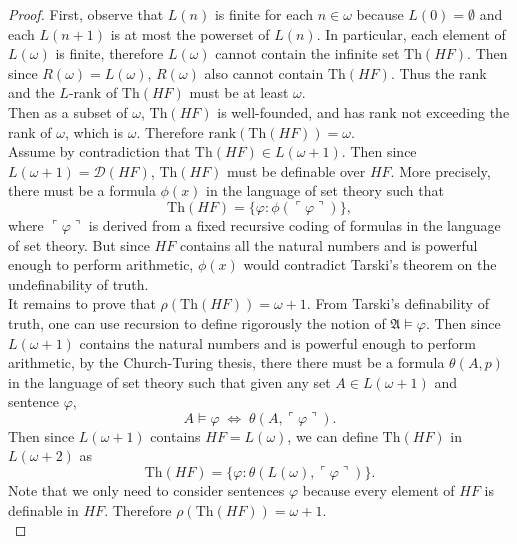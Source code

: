 \documentclass{article}
\begin{document}
  \begin{proof}
    First, observe that $L(n)$ is finite for each $n\in\omega$ because
    $L(0)=\emptyset$ and each $L(n+1)$ is at most the powerset of $L(n)$.
    In particular, each element of $L(\omega)$ is finite, therefore
    $L(\omega)$ cannot contain the infinite set $\text{Th}(HF)$. Then since
    $R(\omega)=L(\omega)$, $R(\omega)$ also cannot contain $\text{Th}(HF)$.
    Thus the rank and the $L$-rank of $\text{Th}(HF)$ must be at least
    $\omega$. \\

    Then as a subset of $\omega$, $\text{Th}(HF)$ is well-founded, and has
    rank not exceeding the rank of $\omega$, which is $\omega$. Therefore
    $\text{rank}(\text{Th}(HF)) =\omega$. \\

    Assume by contradiction that $\text{Th}(HF) \in L(\omega+1)$. Then
    since $L(\omega+1) =\mathcal{D}(HF)$, $\text{Th}(HF)$ must be definable
    over $HF$. More precisely, there must be a formula $\phi(x)$ in the
    language of set theory such that
    \[\text{Th}(HF) =\{\varphi: \phi(\ulcorner\varphi\urcorner)\},\]
    where $\ulcorner\varphi\urcorner$ is derived from a fixed recursive
    coding of formulas in the language of set theory. But since $HF$
    contains all the natural numbers and is powerful enough to perform
    arithmetic, $\phi(x)$ would contradict Tarski's theorem on the
    undefinability of truth. \\ 

    It remains to prove that $\rho(\text{Th}(HF)) =\omega+1$. From
    Tarski's definability of truth, one can use recursion to define
    rigorously the notion of $\mathfrak{A} \models\varphi$. Then since
    $L(\omega+1)$ contains the natural numbers and is powerful enough to
    perform arithmetic, by the Church-Turing thesis, there there must be a
    formula $\theta(A,p)$ in the language of set theory such that given any
    set $A\in L(\omega+1)$ and sentence $\varphi$,
    \[A\models\varphi\; \Leftrightarrow\;
    \theta(A,\ulcorner\varphi\urcorner).\]
    Then since $L(\omega+1)$ contains $HF=L(\omega)$, we can define
    $\text{Th}(HF)$ in $L(\omega+2)$ as
    \[\text{Th}(HF) =\{\varphi:
    \theta(L(\omega),\ulcorner\varphi\urcorner)\}.\]
    Note that we only need to consider sentences $\varphi$ because every
    element of $HF$ is definable in $HF$. Therefore $\rho(\text{Th}(HF))
    =\omega+1$. \\



\end{proof}
\end{document}
